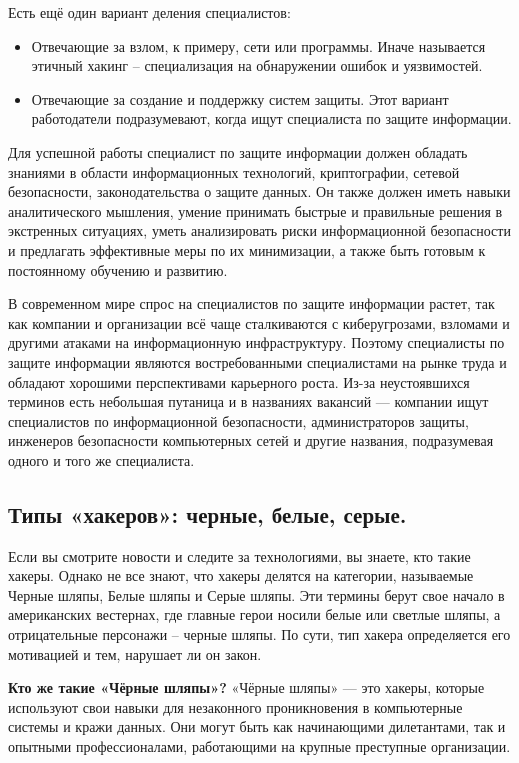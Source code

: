 Есть ещё один вариант деления специалистов:
\begin{itemize}
    \item Отвечающие за взлом, к примеру, сети или программы. Иначе называется этичный хакинг – специализация на обнаружении ошибок и уязвимостей.
    \item Отвечающие за создание и поддержку систем защиты. Этот вариант работодатели подразумевают, когда ищут специалиста по защите информации.
\end{itemize}
Для успешной работы специалист по защите информации должен обладать знаниями в области информационных технологий, 
криптографии, сетевой безопасности, законодательства о защите данных. Он также должен иметь навыки аналитического мышления, 
умение принимать быстрые и правильные решения в экстренных ситуациях, уметь анализировать риски информационной безопасности и 
предлагать эффективные меры по их минимизации, а также быть готовым к постоянному обучению и развитию.

В современном мире спрос на специалистов по защите информации растет, так как компании и организации всё чаще сталкиваются с 
киберугрозами, взломами и другими атаками на информационную инфраструктуру. Поэтому специалисты по защите информации являются 
востребованными специалистами на рынке труда и обладают хорошими перспективами карьерного роста.
Из-за неустоявшихся терминов есть небольшая путаница и в названиях вакансий — компании ищут специалистов по информационной 
безопасности, администраторов защиты, инженеров безопасности компьютерных сетей и другие названия, подразумевая одного и того 
же специалиста.
\newpage
\subsection{Типы «хакеров»: черные, белые, серые.}
Если вы смотрите новости и следите за технологиями, вы знаете, кто такие хакеры. Однако не все знают, что хакеры делятся на категории, называемые Черные шляпы, Белые шляпы и Серые шляпы. Эти термины берут свое начало в американских вестернах, где главные герои носили белые или светлые шляпы, а отрицательные персонажи – черные шляпы.
По сути, тип хакера определяется его мотивацией и тем, нарушает ли он закон.

\textbf{Кто же такие «Чёрные шляпы»?}
«Чёрные шляпы» — это хакеры, которые используют свои навыки для незаконного проникновения в компьютерные системы и кражи данных. Они могут быть как начинающими дилетантами, так и опытными профессионалами, работающими на крупные преступные организации.

